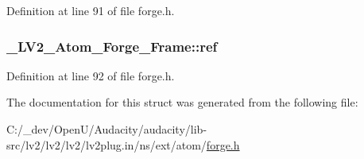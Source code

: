Definition at line 91 of file forge.\+h.

\subsubsection[{\texorpdfstring{ref}{ref}}]{ \+\_\+\+L\+V2\+\_\+\+Atom\+\_\+\+Forge\+\_\+\+Frame\+::ref}\hypertarget{struct___l_v2___atom___forge___frame_ae4d7dc1067426985649b99b871841a01}{}\label{struct___l_v2___atom___forge___frame_ae4d7dc1067426985649b99b871841a01}


Definition at line 92 of file forge.\+h.



The documentation for this struct was generated from the following file\+:\begin{DoxyCompactItemize}
\item 
C\+:/\+\_\+dev/\+Open\+U/\+Audacity/audacity/lib-\/src/lv2/lv2/lv2/lv2plug.\+in/ns/ext/atom/\hyperlink{forge_8h}{forge.\+h}\end{DoxyCompactItemize}
